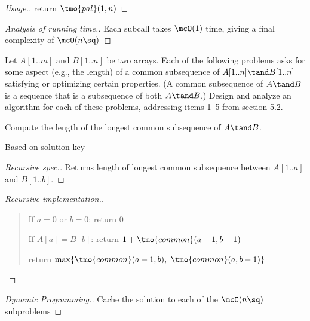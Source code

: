 \documentclass{article}
\begin{document}
\begin{proof}[Usage.]
  return \( \tmo{pal}(1,n) \)
\end{proof}

\begin{proof}[Analysis of running time.]
  Each subcall takes \( \mcO(1) \) time, giving a final complexity of \( \mcO(n\sq) \)
\end{proof}
\pagebreak

 Let \( A[1..m] \) and \( B[1..n] \) be two arrays. Each of the following problems asks for some aspect (e.g., the length) of a common subsequence of \( A[1..n] \tand B[1..n] \) satisfying or optimizing certain properties. (A common subsequence of \( A \tand B \) is a sequence that is a subsequence of both \( A \tand B \).) Design and analyze an algorithm for each of these problems, addressing items 1--5 from section 5.2.
\setcounter{exercise}{2}
\setcounter{subexercise}{0}

\begin{subexercise} %
  Compute the length of the longest common subsequence of \( A \tand B \).
\end{subexercise}

\begin{note}
  Based on solution key
\end{note}

\begin{proof}[Recursive spec.]
  Returns length of longest common subsequence between \( A[1..a] \) and \( B[1..b] \).
\end{proof}

\begin{proof}[Recursive implementation.]\
\begin{quote}
\begin{steps}
  \item If \( a=0 \) or \( b = 0 \): return 0
  \item If \( A[a] = B[b] \): return \( 1+\tmo{common}(a-1,b-1) \)
  \item return \( \max \{\tmo{common}(a-1,b),\ \tmo{common}(a,b-1)\} \)
\end{steps}
\end{quote}
\end{proof}

\begin{proof}[Dynamic Programming.]
Cache the solution to each of the \( \mcO(n\sq) \) subproblems
\end{proof}
\end{document}
